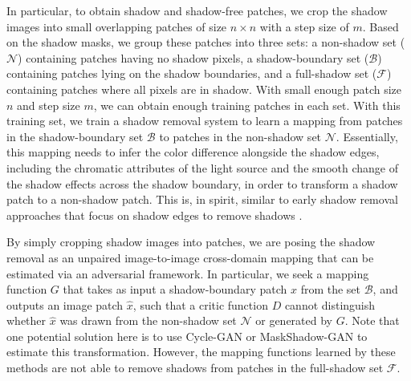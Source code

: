 \documentclass[runningheads]{llncs}
\def\mB{\mathcal{B}}
\def\mF{\mathcal{F}}
\def\mN{\mathcal{N}}
\begin{document}
In particular, to obtain shadow and shadow-free patches, we crop the shadow images into small overlapping patches of size $n\times n$ with a step size of $m$. Based on the shadow masks, we group these patches into three sets: a non-shadow set ($\mN$) containing patches having no shadow pixels, a shadow-boundary set ($\mB$) containing patches lying on the shadow boundaries, and a full-shadow set ($\mF$) containing patches where all pixels are in shadow.
With small enough patch size $n$ and  step size $m$, we can obtain enough training patches in each set. With this training set, we train a shadow removal system to learn a mapping  from patches in the shadow-boundary set $\mB$ to patches in the non-shadow set $\mN$. Essentially, this mapping needs to infer the color difference alongside the shadow edges, including the chromatic attributes of the light source and the smooth change of the shadow effects across the shadow boundary, in order to transform a shadow patch to a non-shadow patch.
This is, in spirit, similar to early shadow removal approaches that focus on shadow edges to remove shadows \cite{shadow_edge,Finlayson02,Finlayson06,Vicente-etal-PAMI18,vicentesingle}.



By simply cropping shadow images into patches, we are posing the shadow removal as an unpaired image-to-image cross-domain mapping \cite{Yi2017DualGANUD,Choi2017StarGANUG,Liu2017UnsupervisedIT} that can be estimated via an adversarial framework. In particular, we seek a mapping function $G$ that takes as input a shadow-boundary patch $x$ from the set $\mB$, and outputs an image patch $\hat{x}$, such that a critic function $D$ cannot distinguish whether  $\hat{x}$ was drawn from the non-shadow set $\mN$ or  generated by $G$. Note that one potential solution here is to use Cycle-GAN or MaskShadow-GAN to estimate this transformation. However, the mapping functions learned by these methods are not able to remove shadows from patches in the full-shadow set $\mF$.  
\end{document}
